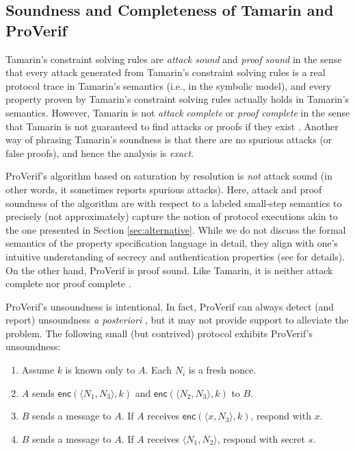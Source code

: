 \documentclass{article}
\theoremstyle{definition}
\begin{document}
\subsection{Soundness and Completeness of Tamarin and ProVerif}\label{sec:soundness-completeness}
Tamarin's constraint solving rules are \textit{attack sound} and \textit{proof sound} in the sense that every attack generated from Tamarin's constraint solving rules is a real protocol trace in Tamarin's semantics (i.e., in the symbolic model), and every property proven by Tamarin's constraint solving rules actually holds in Tamarin's semantics. 
However, Tamarin is not \textit{attack complete} or \textit{proof complete} in the sense that Tamarin is not guaranteed to find attacks or proofs if they exist \cite{tamarin}.  Another way of phrasing Tamarin's soundness is that there are no spurious attacks (or false proofs), and hence the analysis is \textit{exact}.

ProVerif's algorithm based on saturation by resolution is \textit{not} attack sound 
(in other words, it sometimes reports spurious attacks). 
Here, attack and proof soundness of the algorithm are with respect to 
a labeled small-step semantics to precisely (not approximately) capture the notion of protocol executions
akin to the one presented in Section \ref{sec:alternative}.
While we do not discuss the formal semantics of the property specification language in detail, 
they align with one's intuitive understanding of secrecy and 
authentication properties (see \cite{proverif_2016} for details).
On the other hand, ProVerif is proof sound. 
Like Tamarin, it is neither attack complete nor proof complete \cite{proverif}. 

ProVerif's unsoundness is intentional. 
In fact, ProVerif can always detect (and report) unsoundness \textit{a posteriori} \cite{proverif_manual},
but it may not provide support to alleviate the problem. 
The following small (but contrived) protocol exhibits ProVerif's unsoundness:

\begin{enumerate}
    \item[] Assume $k$ is known only to $A$. Each $N_i$ is a fresh nonce.
    \item[(1)] $A$ sends $\textsf{enc}(\langle N_1, N_3 \rangle, k)$ and $\textsf{enc}(\langle N_2, N_3 \rangle, k)$ to $B$.
    \item[(2)] $B$ sends a message to $A$. If $A$ receives $\textsf{enc}(\langle x, N_3 \rangle, k)$, respond with $x$.
    \item[(3)] $B$ sends a message to $A$. If $A$ receives $\langle N_1, N_2 \rangle$, respond with secret $s$.
\end{enumerate}
\end{document}
